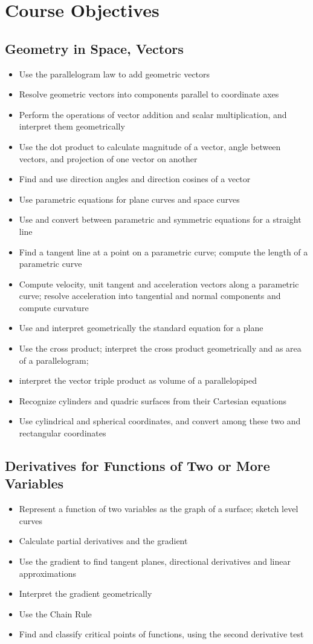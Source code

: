 \documentclass[11pt]{article}
\begin{document}
\section{Course Objectives}
\subsection{Geometry in Space, Vectors}
\begin{itemize}
\setlength\itemsep{-.5em}
\item Use the parallelogram law to add geometric vectors
\item Resolve geometric vectors into components parallel to coordinate axes
\item Perform the operations of vector addition and scalar multiplication,
and interpret them geometrically
\item Use the dot product to calculate magnitude of a vector, angle between vectors, 
and projection of one vector on another
\item Find and use direction angles and direction cosines of a vector
\item Use parametric equations for plane curves and space curves
\item Use and convert between parametric and symmetric equations for a straight line
\item Find a tangent line at a point on a parametric curve;
compute the length of a parametric curve
\item Compute velocity, unit tangent and acceleration vectors along a parametric curve; 
resolve acceleration into tangential and normal components and compute curvature
\item Use and interpret geometrically the standard equation for a plane
\item Use the cross product; interpret the cross product geometrically and as area of a parallelogram; 
\item interpret the vector triple product as volume of a parallelopiped
\item Recognize cylinders and quadric surfaces from their Cartesian equations
\item Use cylindrical and spherical coordinates,
and convert among these two and rectangular coordinates
\end{itemize}
\subsection{Derivatives for Functions of Two or More Variables}
\begin{itemize}
\setlength\itemsep{-.5em}
\item Represent a function of two variables as the graph of a surface;
sketch level curves
\item Calculate partial derivatives and the gradient
\item Use the gradient to find tangent planes,
directional derivatives and linear approximations
\item Interpret the gradient geometrically
\item Use the Chain Rule
\item Find and classify critical points of functions, using the second derivative test
\end{itemize}
\end{document}
